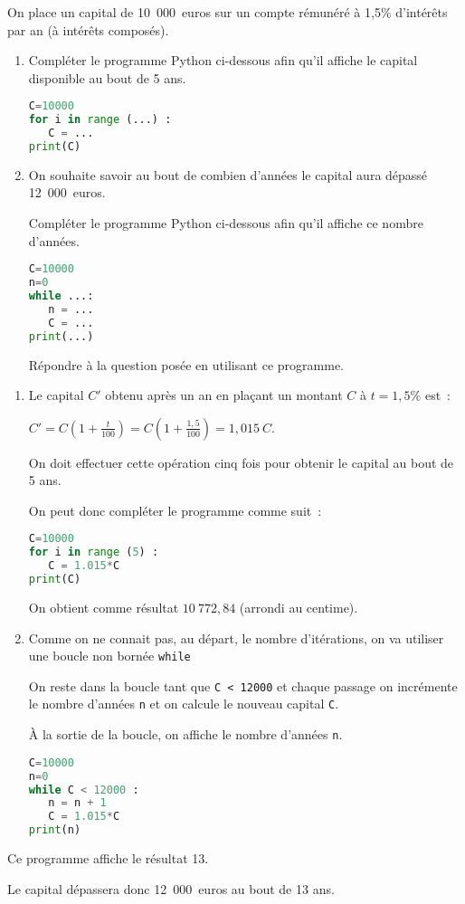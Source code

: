 
%
On place un capital de 10~000~euros sur un compte rémunéré à 1,5\% d'intérêts par an (à intérêts composés).
\par
\begin{enumerate}
     \item
     Compléter le programme Python ci-dessous afin qu'il affiche le capital disponible au bout de 5 ans. 
\begin{lstlisting}[language=Python]
C=10000
for i in range (...) :
   C = ...
print(C)
\end{lstlisting}
\item
On souhaite savoir au bout de combien d'années le capital aura dépassé 12~000~euros.
\par
Compléter le programme Python ci-dessous afin qu'il affiche ce nombre d'années.
\begin{lstlisting}[language=Python]
C=10000
n=0
while ...:
   n = ...
   C = ...
print(...)
\end{lstlisting}
Répondre à la question posée en utilisant ce programme.
\end{enumerate}
\begin{corrige}
     \begin{enumerate}
          \item
          Le capital $ C' $ obtenu après un an en plaçant un montant $C$ à $ t = 1,5\% $ est~:
          \par
          $C' = C \left( 1 + \frac{ t }{ 100 } \right) $\nosp$= C \left( 1 + \frac{ 1,5 }{ 100 } \right) =1,015\ C$.
          \par
          On doit effectuer cette opération cinq fois pour obtenir le capital au bout de 5 ans.
          \par
          On peut donc compléter le programme comme suit~:
\begin{lstlisting}[language=Python]
C=10000
for i in range (5) :
   C = 1.015*C
print(C)
     \end{lstlisting}
     On obtient comme résultat $ 10~772,84 $ (arrondi au centime).
     \item
     Comme on ne connait pas, au départ, le nombre d'itérations, on va utiliser une boucle non bornée \texttt{while}
     \par
     On reste dans la boucle tant que \texttt{C < 12000} et chaque passage on incrémente le nombre d'années \texttt{n} et on calcule le nouveau capital \texttt{C}.
     \par
     À la sortie de la boucle, on affiche le nombre d'années \texttt{n}.
\begin{lstlisting}[language=Python]
C=10000
n=0
while C < 12000 :
   n = n + 1
   C = 1.015*C
print(n)
\end{lstlisting}
\end{enumerate}
Ce programme affiche le résultat 13.
\par
Le capital dépassera donc 12~000~euros au bout de 13 ans.
\end{corrige}
